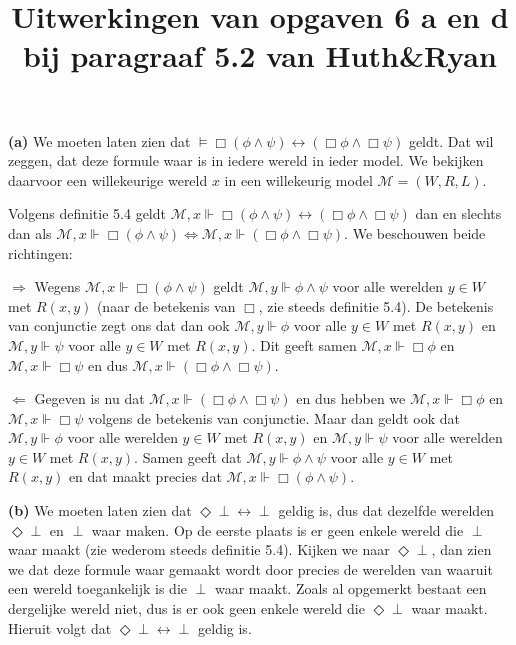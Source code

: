 \documentclass[a4paper,11pt]{article}
\title{Uitwerkingen van opgaven 6 a en d\\
\normalsize{bij paragraaf 5.2 van Huth\&Ryan}}
\date{}
\begin{document}
\maketitle


\begin{description}


\item{\bf (a)}
We moeten laten zien dat $\models \Box(\phi \wedge \psi) \leftrightarrow (\Box \phi \wedge \Box \psi)$ geldt. Dat
wil zeggen, dat deze formule waar is in iedere wereld in ieder model. We bekijken daarvoor een willekeurige wereld
$x$ in een willekeurig model $\mathcal{M} = (W, R, L)$.

Volgens definitie 5.4 geldt $\mathcal{M}, x \Vdash \Box(\phi \wedge \psi) \leftrightarrow (\Box \phi \wedge \Box \psi)$
dan en slechts dan als $\mathcal{M}, x \Vdash \Box(\phi \wedge \psi) \Leftrightarrow \mathcal{M}, x \Vdash (\Box \phi \wedge \Box \psi)$.
We beschouwen beide richtingen:

\begin{description}

\item{\bf $\Rightarrow$}
Wegens $\mathcal{M}, x \Vdash \Box(\phi \wedge \psi)$ geldt $\mathcal{M}, y \Vdash \phi \wedge \psi$ voor alle
werelden $y \in W$ met $R(x,y)$ (naar de betekenis van $\Box$, zie steeds definitie 5.4). De betekenis van
conjunctie zegt ons dat dan ook $\mathcal{M}, y \Vdash \phi$
voor alle $y \in W$ met $R(x,y)$ en $\mathcal{M}, y \Vdash \psi$ voor alle $y \in W$ met $R(x,y)$. Dit geeft
samen $\mathcal{M}, x \Vdash \Box \phi$ en $\mathcal{M}, x \Vdash \Box \psi$ en dus
$\mathcal{M}, x \Vdash (\Box \phi \wedge \Box \psi)$.

\item{\bf $\Leftarrow$}
Gegeven is nu dat $\mathcal{M}, x \Vdash (\Box \phi \wedge \Box \psi)$ en dus hebben we
$\mathcal{M}, x \Vdash \Box \phi$ en $\mathcal{M}, x \Vdash \Box \psi$ volgens de betekenis van conjunctie.
Maar dan geldt ook dat $\mathcal{M}, y \Vdash \phi$ voor alle werelden $y \in W$ met $R(x,y)$ en
$\mathcal{M}, y \Vdash \psi$ voor alle werelden $y \in W$ met $R(x,y)$. Samen geeft dat $\mathcal{M}, y \Vdash \phi \wedge \psi$
voor alle $y \in W$ met $R(x,y)$ en dat maakt precies dat $\mathcal{M}, x \Vdash \Box(\phi \wedge \psi)$.

\end{description}


\item{\bf (b)}
We moeten laten zien dat $\Diamond \perp \leftrightarrow \perp$ geldig is, dus dat dezelfde werelden
$\Diamond \perp$ en $\perp$ waar maken. Op de eerste plaats is er geen enkele wereld die $\perp$ waar
maakt (zie wederom steeds definitie 5.4). Kijken we naar $\Diamond \perp$, dan zien we dat deze formule
waar gemaakt wordt door precies de werelden van waaruit een wereld toegankelijk is die $\perp$ waar maakt.
Zoals al opgemerkt bestaat een dergelijke wereld niet, dus is er ook geen enkele wereld die $\Diamond \perp$
waar maakt. Hieruit volgt dat $\Diamond \perp \leftrightarrow \perp$ geldig is.


\end{description}
\end{document}
